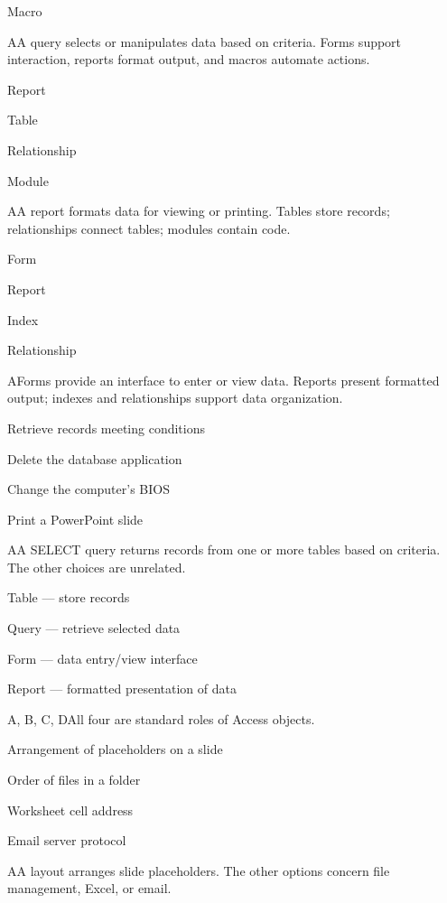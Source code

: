 \begin{enumerate}[label=\textbf{Q\arabic*.}, leftmargin=*]
{   \item Macro}
  {A}{A query selects or manipulates data based on criteria. Forms support interaction, reports format output, and macros automate actions.}
  {\item Report
   \item Table
   \item Relationship
   \item Module}
  {A}{A report formats data for viewing or printing. Tables store records; relationships connect tables; modules contain code.}
  {\item Form
   \item Report
   \item Index
   \item Relationship}
  {A}{Forms provide an interface to enter or view data. Reports present formatted output; indexes and relationships support data organization.}
  {\item Retrieve records meeting conditions
   \item Delete the database application
   \item Change the computer's BIOS
   \item Print a PowerPoint slide}
  {A}{A SELECT query returns records from one or more tables based on criteria. The other choices are unrelated.}
  {\item Table --- store records
   \item Query --- retrieve selected data
   \item Form --- data entry/view interface
   \item Report --- formatted presentation of data}
  {A, B, C, D}{All four are standard roles of Access objects.}
\fi
\ifnum{}
  {\item Arrangement of placeholders on a slide
   \item Order of files in a folder
   \item Worksheet cell address
   \item Email server protocol}
  {A}{A layout arranges slide placeholders. The other options concern file management, Excel, or email.}

\end{enumerate}
